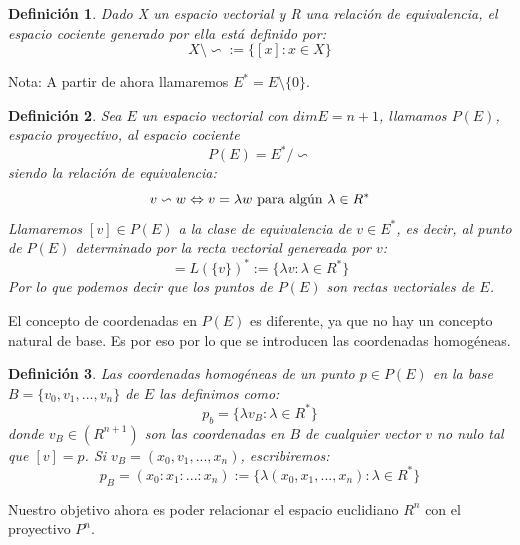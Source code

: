 \documentclass[a4paper,11pt, oneside]{book}
\newtheorem{defi}{Definición}
\begin{document}
\begin{defi}
	Dado X un espacio vectorial y R una relación de equivalencia, el espacio cociente generado por ella está definido por:
	\begin{equation}
		X \setminus \backsim := \{[x]: x \in X\}
	\end{equation}
\end{defi}



Nota: A partir de ahora llamaremos $E^* = E \setminus \{0\}$.
\begin{defi}
	Sea $E$ un espacio vectorial con $dim E=n+1$, llamamos $P(E)$, espacio proyectivo, al espacio cociente
	\begin{equation}
		P(E) = E^* / \backsim
	\end{equation}
	siendo la relación de equivalencia:
	\begin{equation}
		v \backsim w \Leftrightarrow v = \lambda w \textup{ para algún } \lambda \in R^* 
	\end{equation}
	Llamaremos $[v] \in P(E)$ a la clase de equivalencia de $v \in E^*$, es decir, al punto de $P(E)$ determinado por la recta vectorial genereada por $v$:
	\begin{equation}
		[v] = L(\{v\})^* := \{\lambda v: \lambda \in R^*\}
	\end{equation}
	Por lo que podemos decir que los puntos de $P(E)$ son rectas vectoriales de $E$.
\end{defi}

El concepto de coordenadas en $P(E)$ es diferente, ya que no hay un concepto natural de base. Es por eso por lo que se introducen las coordenadas homogéneas.
\begin{defi}
	Las coordenadas homogéneas de un punto $p \in P(E)$ en la base $B = \{v_0,v_1,...,v_n\}$ de $E$ las definimos como:
	\begin{equation}
		p_b = \{\lambda v_B: \lambda \in R^*\}
	\end{equation}
	donde $v_B \in (R^{n+1})$ son las coordenadas en $B$ de cualquier vector $v$ no nulo tal que $[v] = p$. Si $v_B = (x_0,v_1,...,x_n)$, escribiremos:
	\begin{equation}
		p_B = (x_0:x_1:...:x_n) := \{\lambda(x_0,x_1,...,x_n): \lambda \in R^*\}
	\end{equation}
\end{defi}

Nuestro objetivo ahora es poder relacionar el espacio euclidiano $R^n$ con el proyectivo $P^n$. 
\end{document}
